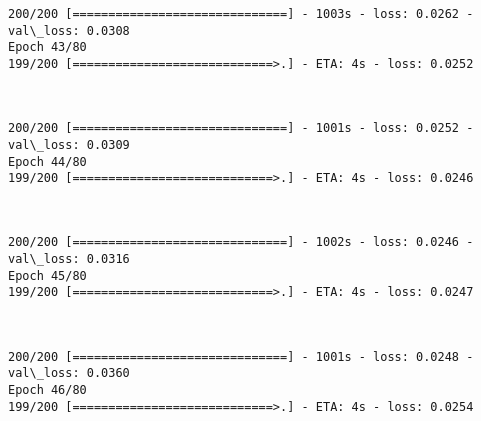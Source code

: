 \documentclass[11pt]{article}
\begin{document}
    \begin{Verbatim}[commandchars=\\\{\}]
200/200 [==============================] - 1003s - loss: 0.0262 - val\_loss: 0.0308
Epoch 43/80
199/200 [============================>.] - ETA: 4s - loss: 0.0252
    \end{Verbatim}

    \begin{center}
    \end{center}
    { \hspace*{\fill} \\}
    
    \begin{Verbatim}[commandchars=\\\{\}]
200/200 [==============================] - 1001s - loss: 0.0252 - val\_loss: 0.0309
Epoch 44/80
199/200 [============================>.] - ETA: 4s - loss: 0.0246
    \end{Verbatim}

    \begin{center}
    \end{center}
    { \hspace*{\fill} \\}
    
    \begin{Verbatim}[commandchars=\\\{\}]
200/200 [==============================] - 1002s - loss: 0.0246 - val\_loss: 0.0316
Epoch 45/80
199/200 [============================>.] - ETA: 4s - loss: 0.0247
    \end{Verbatim}

    \begin{center}
    \end{center}
    { \hspace*{\fill} \\}
    
    \begin{Verbatim}[commandchars=\\\{\}]
200/200 [==============================] - 1001s - loss: 0.0248 - val\_loss: 0.0360
Epoch 46/80
199/200 [============================>.] - ETA: 4s - loss: 0.0254
    \end{Verbatim}

    \begin{center}
    \end{center}
    { \hspace*{\fill} \\}
    
\end{document}

